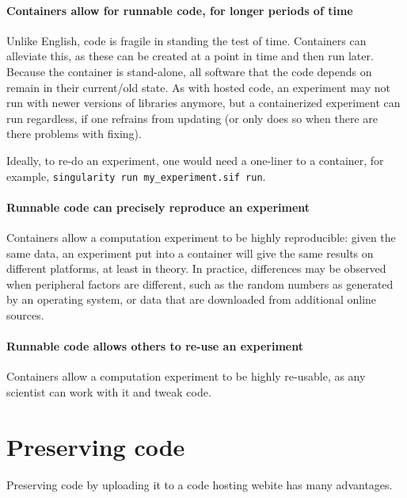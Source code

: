 \paragraph{Containers allow for runnable code, for longer periods of time}

Unlike English, code is fragile in standing the test of time.
Containers can alleviate this, as these can be created at a point
in time and then run later. Because the container is stand-alone,
all software that the code depends on remain in their current/old state.
As with hosted code, an experiment may not run with newer versions
of libraries anymore, but a containerized experiment can run regardless, 
if one refrains from updating (or only does so when there are there problems with fixing).

Ideally, to re-do an experiment, one would need a one-liner to a container,
for example, \verb|singularity run my_experiment.sif run|.

\paragraph{Runnable code can precisely reproduce an experiment}

Containers allow a computation experiment to be highly reproducible:
given the same data, an experiment put into a container will give
the same results on different platforms, at least in theory.
In practice, differences may be observed when peripheral factors
are different, such as the random numbers as generated by an operating
system, or data that are downloaded from additional online sources.

\paragraph{Runnable code allows others to re-use an experiment}

Containers allow a computation experiment to be highly re-usable,
as any scientist can work with it and tweak code.

\section{Preserving code}

Preserving code by uploading it to a code hosting webite
has many advantages.

